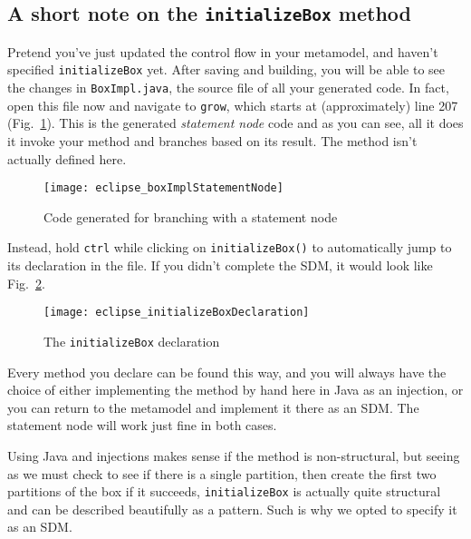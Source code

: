 \newpage
\hypertarget{initialize notes}{}
\subsection{A short note on the \texttt{initializeBox} method}
\genHeader

Pretend you've just updated the control flow in your metamodel, and haven't specified \texttt{initializeBox} yet. After saving and building, you will be able
to see the changes in \texttt{BoxImpl.java}, the source file of all your generated code. In fact, open this file now and navigate to \texttt{grow}, which
starts at (approximately) line 207 (Fig.~\ref{fig:initBoxImpl}). This is the generated \emph{statement node} code and as you can see, all it does it invoke your
method and branches based on its result. The method isn't actually defined here.

\begin{figure}[htp]
\begin{center}
  \texttt{[image: eclipse\_boxImplStatementNode]}
  \caption{Code generated for branching with a statement node}
  \label{fig:initBoxImpl}
\end{center}
\end{figure}

Instead, hold \texttt{ctrl} while clicking on \texttt{initializeBox()} to automatically jump to its declaration in the file. If you didn't complete the SDM, it
would look like Fig.~\ref{fig:initBoxDecl}.

\begin{figure}[htp]
\begin{center}
  \texttt{[image: eclipse\_initializeBoxDeclaration]}
  \caption{The \texttt{initializeBox} declaration}
  \label{fig:initBoxDecl}
\end{center}
\end{figure}

Every method you declare can be found this way, and you will always have the choice of either implementing the method by hand here
in Java as an injection, or you can return to the metamodel and implement it there as an SDM. The statement node will work just fine in both cases. 

Using Java and injections makes sense if the method is non-structural, but seeing as we must check to see if there is a single partition, then create the
first two partitions of the box if it succeeds, \texttt{initializeBox} is actually quite structural and can be described beautifully as a pattern. Such is why
we opted to specify it as an SDM.

